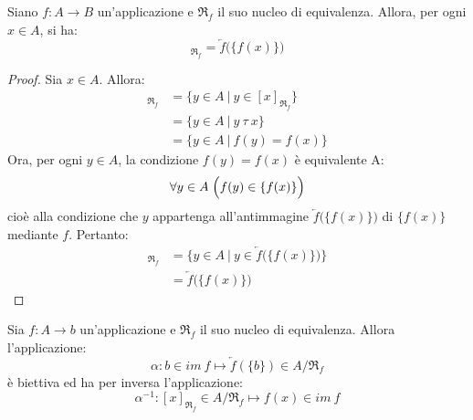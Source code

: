 \begin{lemmabox}\label{lemma:prop_classi_equivalenza3}
	Siano $f: A \rightarrow B$ un'applicazione e $\mathfrak{R}_{f}$ il suo nucleo di equivalenza. Allora, per ogni $x \in A$, si ha:
	\begin{equation}
		[x]_{\mathfrak{R}_{f}} = \overleftarrow{f}\bigl( \{f(x)\}\bigr)
	\end{equation}
\end{lemmabox}


\begin{proof}
	Sia $x \in A$. Allora:
	\begin{align*}
		[x]_{\mathfrak{R}_{f}} &= \{y \in A \ | \ y \in [x]_{\mathfrak{R}_{f}}\}\\
		&= \{y \in A \ | \ y \ \tau \ x \} \\
		&= \{y \in A \ | \ f(y) = f(x) \}
	\end{align*}
	Ora, per ogni $y \in A $, la condizione $f(y) = f(x)$ è equivalente A:
	\begin{displaymath}
		\forall y \in A \; \Bigl( f(y) \in \{f(x)\} \Bigr)
	\end{displaymath}
	cioè alla condizione che $y$ appartenga all'antimmagine $\overleftarrow{f}\bigl(\{f(x)\}\bigr)$ di $\{f(x)\}$ mediante $f$. Pertanto:
	\begin{align*}
		[x]_{\mathfrak{R}_{f}} &= \{y \in A \ | \ y \in \overleftarrow{f}\bigl(\{f(x)\}\bigr) \} \\
		&= \overleftarrow{f}\bigl(\{f(x)\}\bigr)
	\end{align*}
\end{proof}

\begin{teorbox}\label{thm:teor_omomorfismo}
	Sia $f: A \longrightarrow b$ un'applicazione e $\mathfrak{R}_{f}$ il suo nucleo di equivalenza. Allora l'applicazione: $$\alpha: b \in im \ f \mapsto \overleftarrow{f}(\{b\}) \in A/{\mathfrak{R}_{f}}$$ è biettiva ed ha per inversa l'applicazione:
	\begin{displaymath}
		\alpha^{-1} : [x]_{\mathfrak{R}_{f}} \in A/{\mathfrak{R}_{f}} \mapsto f(x) \in im \ f
	\end{displaymath}
\end{teorbox}


